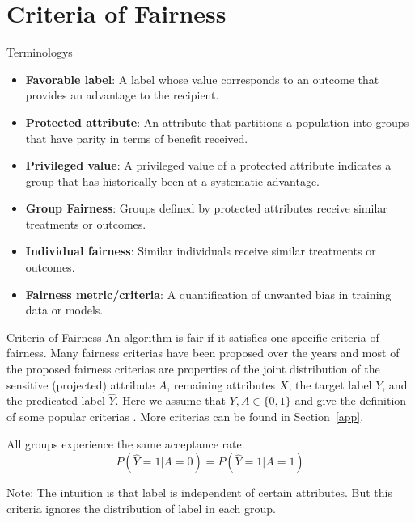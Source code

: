 \documentclass[10pt, xcolor=table,aspectratio=169]{beamer}
\begin{document}
\section{Criteria of Fairness}

\begin{frame}{Terminologys}
	\begin{itemize}
		\item \textbf{Favorable label}:  A label whose value corresponds to an outcome that provides an advantage to the recipient.
		\item \textbf{Protected attribute}: An attribute that partitions a population into groups that have parity in terms of benefit received.
		\item \textbf{Privileged value}: A privileged value of a protected attribute indicates a group that has historically been at a systematic advantage.
		\item \textbf{Group Fairness}: Groups defined by protected attributes receive similar treatments or outcomes.
		\item \textbf{Individual fairness}: Similar individuals receive similar treatments or outcomes.
		\item \textbf{Fairness metric/criteria}: A quantification of unwanted bias in training data or models.
	\end{itemize}

\end{frame}

\begin{frame}{Criteria of Fairness}
	An algorithm is fair if it satisfies one specific criteria of fairness.
	Many fairness criterias have been proposed over the years and most of the proposed fairness criterias are properties of the joint
	distribution of the sensitive (projected) attribute $A$, remaining attributes $X$, the target label $Y$, and the	predicated label $\hat{Y}$. Here we assume that $Y, A\in \{0,1\}$ and give the definition of some popular criterias \cite{dunkelau2019fairness}. More criterias can be found in Section~\ref{app}.
	\begin{definition}[Independence]
		All groups experience the same acceptance rate.
		$$ P(\hat{Y}=1|A=0)=P(\hat{Y}=1|A=1)$$
	\end{definition}
	Note: The intuition is that label is independent of certain attributes. But this criteria ignores the distribution of label in each group.

\end{frame}
\end{document}

